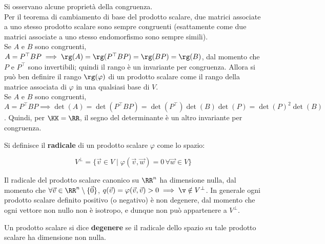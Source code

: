 \documentclass[11pt]{article}
\begin{document}
	\begin{remark}
		Si osservano alcune proprietà della congruenza. \\
		
		\li Per il teorema di cambiamento di base del prodotto scalare, due matrici associate a uno stesso
		prodotto scalare sono sempre congruenti (esattamente come due matrici associate a uno stesso
		endomorfismo sono sempre simili). \\
		\li Se $A$ e $B$ sono congruenti, $A = P^\top B P \implies \rg(A) = \rg(P^\top B P) = \rg(BP) = \rg(B)$,
		dal momento che $P$ e $P^\top$ sono invertibili; quindi il rango è un invariante per congruenza. Allora
		si può ben definire il rango $\rg(\varphi)$ di un prodotto scalare come il rango della matrice
		associata di $\varphi$ in una qualsiasi base di $V$. \\
		\li Se $A$ e $B$ sono congruenti, $A = P^\top B P \implies \det(A) = \det(P^\top B P) = \det(P^\top) \det(B) \det(P)=
		\det(P)^2 \det(B)$. Quindi, per $\KK = \RR$, il segno del determinante è un altro invariante per congruenza.
	\end{remark}

	\begin{definition}
		Si definisce il \textbf{radicale} di un prodotto scalare $\varphi$ come lo spazio:
		
		\[ V^\perp = \{ \vec{v} \in V \mid \varphi(\vec{v}, \vec{w}) = 0 \, \forall \vec{w} \in V \} \]
		
		\vskip 0.05in
	\end{definition}
	
	\begin{remark}
		Il radicale del prodotto scalare canonico su $\RR^n$ ha dimensione nulla, dal momento che $\forall \vec{v} \in \RR^n \setminus \{\vec{0}\}$, $q(\vec{v}) = \varphi(\vec{v}, \vec{v}) > 0 \implies \v \notin V^\perp$. In
		generale ogni prodotto scalare definito positivo (o negativo) è non degenere, dal momento che ogni vettore
		non nullo non è isotropo, e dunque non può appartenere a $V^\perp$.
	\end{remark}

	\begin{definition}
		Un prodotto scalare si dice \textbf{degenere} se il radicale dello spazio su tale prodotto scalare ha
		dimensione non nulla.
	\end{definition}
	
\end{document}
